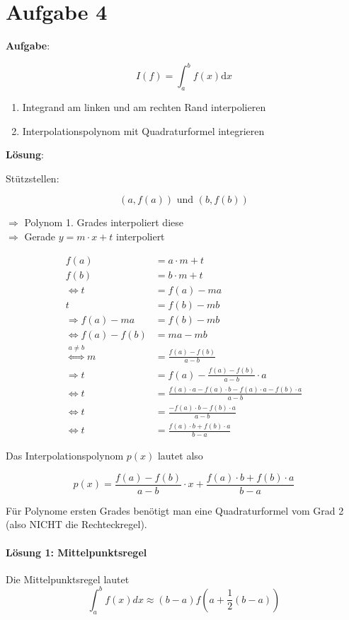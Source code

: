 \section*{Aufgabe 4}
\textbf{Aufgabe}: 

\[I(f) = \int_a^b f(x) \mathrm{d}x \]

\begin{enumerate}
	\item Integrand am linken und am rechten Rand interpolieren
	\item Interpolationspolynom mit Quadraturformel integrieren
\end{enumerate}

\textbf{Lösung}:

Stützstellen:

\[(a, f(a)) \text{ und } (b, f(b))\]

$\Rightarrow$ Polynom 1. Grades interpoliert diese \\
$\Rightarrow$ Gerade $y = m \cdot x +t$ interpoliert

\begin{align}
    f(a) &= a \cdot m + t\\
	f(b) &= b \cdot m + t\\
\Leftrightarrow 
	t &= f(a) - ma\\
	t &= f(b) - mb\\
\Rightarrow 
	f(a) - ma &= f(b) - mb\\
\Leftrightarrow	f(a) - f(b) &= ma - mb\\
\stackrel{a \neq b}{\Leftrightarrow}	m &= \frac{f(a) - f(b)}{a - b}\\
\Rightarrow t &= f(a) - \frac{f(a) - f(b)}{a - b} \cdot a\\
\Leftrightarrow t &= \frac{f(a) \cdot a - f(a) \cdot b - f(a) \cdot a - f(b) \cdot a}{a-b}\\
\Leftrightarrow t &= \frac{- f(a) \cdot b - f(b) \cdot a}{a-b}\\
\Leftrightarrow t &= \frac{f(a) \cdot b + f(b) \cdot a}{b-a}
\end{align}

Das Interpolationspolynom $p(x)$ lautet also

\[ p(x) = \frac{f(a) - f(b)}{a - b} \cdot x + \frac{f(a) \cdot b + f(b) \cdot a}{b-a}\]

Für Polynome ersten Grades benötigt man eine Quadraturformel vom Grad 2 (also NICHT die Rechteckregel). 

\paragraph{Lösung 1: Mittelpunktsregel}
Die Mittelpunktsregel lautet
\[\int_a^b f(x) dx \approx (b-a) f(a + \frac{1}{2}(b-a))\]

